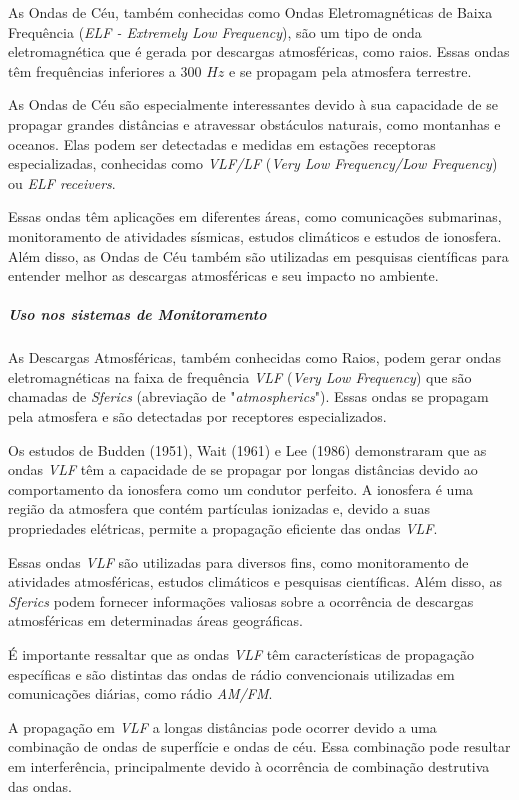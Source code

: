 \documentclass[a4paper, 12pt, onecolumn,singlespacing]{article}
\begin{document}
		As Ondas de Céu, também conhecidas como Ondas Eletromagnéticas de Baixa Frequência (\textit{ELF - Extremely Low Frequency}), são um tipo de onda eletromagnética que é gerada por descargas atmosféricas, como raios. Essas ondas têm frequências inferiores a 300 $Hz$ e se propagam pela atmosfera terrestre.
		
		As Ondas de Céu são especialmente interessantes devido à sua capacidade de se propagar grandes distâncias e atravessar obstáculos naturais, como montanhas e oceanos. Elas podem ser detectadas e medidas em estações receptoras especializadas, conhecidas como \textit{VLF/LF} (\textit{Very Low Frequency/Low Frequency}) ou \textit{ELF receivers}.
		
		Essas ondas têm aplicações em diferentes áreas, como comunicações submarinas, monitoramento de atividades sísmicas, estudos climáticos e estudos de ionosfera. Além disso, as Ondas de Céu também são utilizadas em pesquisas científicas para entender melhor as descargas atmosféricas e seu impacto no ambiente.

		\subparagraph{Uso nos sistemas de Monitoramento}
		
		As Descargas Atmosféricas, também conhecidas como Raios, podem gerar ondas eletromagnéticas na faixa de frequência \textit{VLF} (\textit{Very Low Frequency}) que são chamadas de \textit{Sferics} (abreviação de "\textit{atmospherics}"). Essas ondas se propagam pela atmosfera e são detectadas por receptores especializados.
		
		Os estudos de Budden (1951), Wait (1961) e Lee (1986) demonstraram que as ondas \textit{VLF} têm a capacidade de se propagar por longas distâncias devido ao comportamento da ionosfera como um condutor perfeito. A ionosfera é uma região da atmosfera que contém partículas ionizadas e, devido a suas propriedades elétricas, permite a propagação eficiente das ondas \textit{VLF}.
		
		Essas ondas \textit{VLF} são utilizadas para diversos fins, como monitoramento de atividades atmosféricas, estudos climáticos e pesquisas científicas. Além disso, as \textit{Sferics} podem fornecer informações valiosas sobre a ocorrência de descargas atmosféricas em determinadas áreas geográficas.
		
		É importante ressaltar que as ondas \textit{VLF} têm características de propagação específicas e são distintas das ondas de rádio convencionais utilizadas em comunicações diárias, como rádio \textit{AM/FM}.
	
		A propagação em \textit{VLF} a longas distâncias pode ocorrer devido a uma combinação de ondas de superfície e ondas de céu. Essa combinação pode resultar em interferência, principalmente devido à ocorrência de combinação destrutiva das ondas.
		
\end{document}
